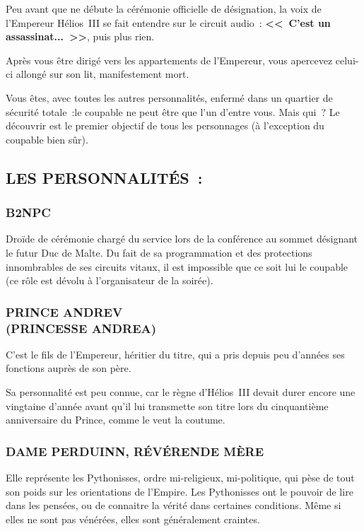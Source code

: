 \documentclass[14pt,twocolumn]{extarticle}
\begin{document}
Peu avant que ne débute la cérémonie officielle de désignation, la voix de
l'Empereur Hélios~III se fait entendre sur le circuit audio~:
\textbf{<<~C'est un assassinat...~>>}, puis plus rien.

Après vous être dirigé vers les appartements de l'Empereur, vous apercevez
celui-ci allongé sur son lit, manifestement mort.

Vous êtes, avec toutes les autres personnalités, enfermé dans un quartier de
sécurité totale~:le coupable ne peut être que l'un d'entre vous. Mais qui~?
Le découvrir est le premier objectif de tous les personnages (à l'exception du
coupable bien sûr).

\clearpage

\subsection{LES PERSONNALITÉS~:}

\subsubsection{B2NPC}

Droïde de cérémonie chargé du service lors de la conférence au sommet désignant
le futur Duc de Malte. Du fait de sa programmation et des protections
innombrables de ses circuits vitaux, il est impossible que ce soit lui le
coupable (ce rôle est dévolu à l'organisateur de la soirée).

\subsubsection{PRINCE ANDREV\\(PRINCESSE ANDREA)}

C'est le fils de l'Empereur, héritier du titre, qui a pris depuis peu d'années
ses fonctions auprès de son père.

Sa personnalité est peu connue, car le règne d'Hélios~III devait durer
encore une vingtaine d'année avant qu'il lui transmette son titre lors du
cinquantième anniversaire du Prince, comme le veut la coutume.

\subsubsection{DAME PERDUINN, RÉVÉRENDE MÈRE}

Elle représente les Pythonisses, ordre mi-religieux, mi-politique, qui pèse de
tout son poids sur les orientations de l'Empire. Les Pythonisses ont le pouvoir
de lire dans les pensées, ou de connaitre la vérité dans certaines conditions.
Même si elles ne sont pas vénérées, elles sont généralement craintes.
\end{document}
